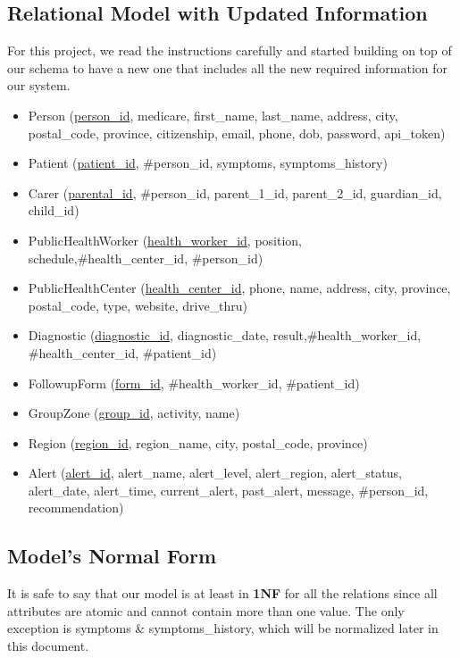 \subsection{Relational Model with Updated Information}
For this project, we read the instructions carefully and started building on top of our schema to have a new one that includes all the new required information for our system.
\begin{itemize}
    \item Person (\underline{person\_id}, medicare, first\_name, last\_name, address, city, postal\_code, province, citizenship, email, phone, dob, password, api\_token)
    \item Patient (\underline{patient\_id}, \#person\_id, symptoms, symptoms\_history)
    \item Carer (\underline{parental\_id}, \#person\_id, parent\_1\_id, parent\_2\_id, guardian\_id, child\_id)
    \item PublicHealthWorker (\underline{health\_worker\_id}, position, schedule,\#health\_center\_id, \#person\_id)
    \item PublicHealthCenter (\underline{health\_center\_id}, phone, name, address, city, province, postal\_code, type, website, drive\_thru)
    \item Diagnostic (\underline{diagnostic\_id}, diagnostic\_date, result,\#health\_worker\_id, \#health\_center\_id, \#patient\_id)
    \item FollowupForm (\underline{form\_id}, \#health\_worker\_id, \#patient\_id)
    \item GroupZone (\underline{group\_id}, activity, name)
    \item Region (\underline{region\_id}, region\_name, city, postal\_code, province)
    \item Alert (\underline{alert\_id}, alert\_name, alert\_level, alert\_region, alert\_status, alert\_date, alert\_time, current\_alert, past\_alert, message, \#person\_id, recommendation)
    \end{itemize}

\subsection{Model's Normal Form}
It is safe to say that our model is at least in \textbf{1NF} for all the relations since all attributes are atomic and cannot contain more than one value. The only exception is symptoms \& symptoms\_history, which will be normalized later in this document.
